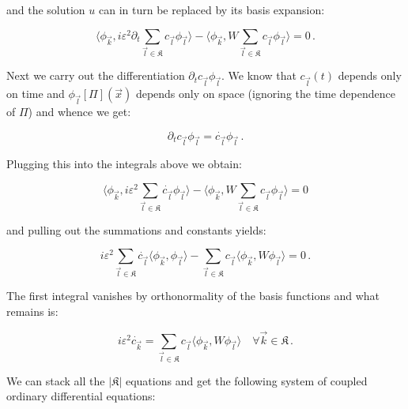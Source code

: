 and the solution $u$ can in turn be replaced by its basis expansion:

\begin{equation*}
  \langle \phi_{\vec{k}}, i\varepsilon^2 \partial_t
                          \sum_{\vec{l}\in\mathfrak{K}} c_{\vec{l}} \phi_{\vec{l}}
  \rangle -
  \langle \phi_{\vec{k}}, W
                          \sum_{\vec{l}\in\mathfrak{K}} c_{\vec{l}} \phi_{\vec{l}}
  \rangle = 0 \,.
\end{equation*}

Next we carry out the differentiation $\partial_t c_{\vec{l}} \phi_{\vec{l}}$.
We know that $c_{\vec{l}}(t)$ depends only on time and $\phi_{\vec{l}}[\Pi](\vec{x})$
depends only on space (ignoring the time dependence of $\Pi$) and whence we get:

\begin{equation*}
  \partial_t c_{\vec{l}} \phi_{\vec{l}} = \dot{c_{\vec{l}}} \phi_{\vec{l}} \,.
\end{equation*}

Plugging this into the integrals above we obtain:

\begin{equation*}
  \langle \phi_{\vec{k}}, i\varepsilon^2
                          \sum_{\vec{l}\in\mathfrak{K}} \dot{c_{\vec{l}}} \phi_{\vec{l}}
  \rangle -
  \langle \phi_{\vec{k}}, W
                          \sum_{\vec{l}\in\mathfrak{K}} c_{\vec{l}} \phi_{\vec{l}}
  \rangle = 0
\end{equation*}

and pulling out the summations and constants yields:

\begin{equation*}
  i\varepsilon^2 \sum_{\vec{l}\in\mathfrak{K}} \dot{c_{\vec{l}}}
  \langle \phi_{\vec{k}}, \phi_{\vec{l}} \rangle
  -
  \sum_{\vec{l}\in\mathfrak{K}} c_{\vec{l}}
  \langle \phi_{\vec{k}}, W \phi_{\vec{l}} \rangle
  = 0 \,.
\end{equation*}

The first integral vanishes by orthonormality of the basis functions and what
remains is:

\begin{equation*}
  i\varepsilon^2 \dot{c_{\vec{k}}}
  =
  \sum_{\vec{l}\in\mathfrak{K}} c_{\vec{l}}
  \langle \phi_{\vec{k}}, W \phi_{\vec{l}} \rangle
  \quad \forall \vec{k} \in \mathfrak{K} \,.
\end{equation*}

We can stack all the $|\mathfrak{K}|$ equations and get the following system
of coupled ordinary differential equations:

